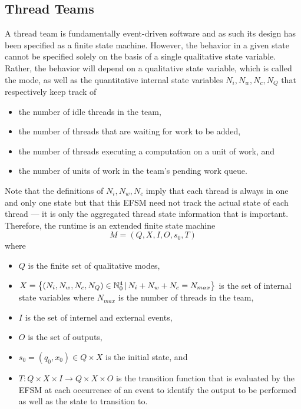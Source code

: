 \documentclass{article}
\newcommand{\N}                 {{\mathbb N}}
\begin{document}
\subsection{Thread Teams}
A thread team is fundamentally event-driven software and as such its design
has been specified as a finite state machine.  However, the behavior in a given
state cannot be specified solely on the basis of a single qualitative state
variable.  Rather, the behavior will depend on a qualitative state variable,
which is called the mode, as well as the quantitative internal state variables
$N_i, N_w, N_c, N_Q$ that respectively keep track of 
\begin{itemize}
\item{the number of idle threads in the team,}
\item{the number of threads that are waiting for work to be added,}
\item{the number of threads executing a computation on a unit of work, and}
\item{the number of units of work in the team's pending work queue.}
\end{itemize}
Note that the definitions of $N_i, N_w, N_c$ imply that each thread is
always in one and only one state but that this EFSM need not track the actual
state of each thread --- it is only the aggregated thread state information that
is important.  Therefore, the runtime is an extended finite state machine 
\[
M = (Q, X, I, O, s_0, T)
\]
where
\begin{itemize}
\item{$Q$ is the finite set of qualitative modes,}
\item{$X = \set{(N_i, N_w, N_c, N_Q) \in \N_0^4\,|\,N_i + N_w + N_c =
N_{max}}$ is the set of internal state variables where $N_{max}$ is the
number of threads in the team,}
\item{$I$ is the set of internel and external events,}
\item{$O$ is the set of outputs,}
\item{$s_0 = (q_0, x_0) \in Q \times X$ is the initial state, and}
\item{$T : Q \times X \times I \to Q \times X \times O$ is the transition
function that is evaluated by the EFSM at each occurrence of an event to
identify the output to be performed as well as the state to transition to.}
\end{itemize}
\end{document}

